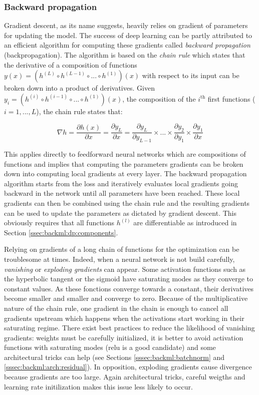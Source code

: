 \subsubsection{Backward propagation}
\label{sssec:backml:backprop}

Gradient descent, as its name suggests, heavily relies on gradient of parameters
for updating the model. The success of deep learning can be partly attributed to
an efficient algorithm for computing these gradients called \textit{backward propagation}
\cite{rumelhart1986learning} (\aka backpropagation). The algorithm is based
on the \textit{chain rule} which states that the derivative of a composition of
functions $y(x) = (h^{(L)} \circ h^{(L-1)} \circ ... \circ h^{(1)})(x)$ with respect
to its input can be broken down into a product of derivatives. Given
$y_i = (h^{(i)} \circ h^{(i-1)} \circ ... \circ h^{(1)})(x)$, the composition of
the $i^{\text{th}}$ first functions ($i = 1, ..., L$), the chain rule states
that:

\begin{equation}
\label{eqn:backml:chainrule}
\nabla h = \dfrac{\partial h(x)}{\partial x} = \dfrac{\partial y_L}{\partial x} = \dfrac{\partial y_L}{\partial y_{L-1}} \times ... \times \dfrac{\partial y_2}{\partial y_1} \times \dfrac{\partial y_1}{\partial x}
\end{equation}

This applies directly to feedforward neural networks which are compositions of
functions and implies that computing the parameters gradients can be broken down
into computing local gradients at every layer. The backward propagation algorithm
starts from the loss and iteratively evaluates local gradients going backward in
the network until all parameters have been reached. These local gradients can then
be combined using the chain rule and the resulting gradients can be used to update
the parameters as dictated by gradient descent. This obviously requires that all
functions $h^{(l)}$ are differentiable as introduced in Section
\ref{ssec:backml:dp:components}.

Relying on gradients of a long chain of functions for the optimization can be
troublesome at times. Indeed, when a neural network is not build carefully,
\textit{vanishing} or \textit{exploding gradients} can appear. Some activation
functions such as the hyperbolic tangent or the sigmoid have saturating modes as
they converge to constant values. As these fonctions converge towards a constant,
their derivatives become smaller and smaller and converge to zero. Because of the
multiplicative nature of the chain rule, one gradient in the chain is enough to
cancel all gradients upstream which happens when the activations start working in
their saturating regime. There exist best practices to reduce the likelihood of
vanishing gradients: weights must be carefully initialized, it is better to avoid
activation functions with saturating modes (\acrshort{relu} is a good candidate)
and some architectural tricks can help (see Sections \ref{sssec:backml:batchnorm}
and \ref{sssec:backml:arch:residual}). In opposition, exploding gradients cause
divergence because gradients are too large. Again architectural tricks, careful
weigths and learning rate initilization makes this issue less likely to occur.

